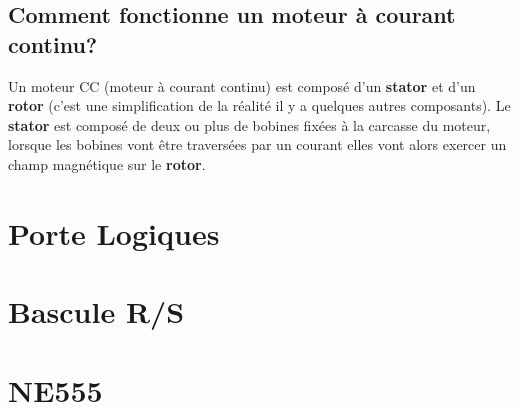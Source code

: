 \documentclass[10pt,a4paper]{article}
\begin{document}
\subsection{Comment fonctionne un moteur à courant continu?}

Un moteur CC (moteur à courant continu) est composé d'un \textbf{stator} et d'un \textbf{rotor} (c'est une simplification de la réalité il y a quelques autres composants). 
Le \textbf{stator} est composé de deux ou plus de bobines fixées à la carcasse du moteur, lorsque les bobines vont être traversées par un courant elles vont alors exercer un champ magnétique sur le \textbf{rotor}.  

\section{Porte Logiques}

\section{Bascule R/S}

\section{NE555}


\cite{MoteurCCEskimon}


\end{document}
